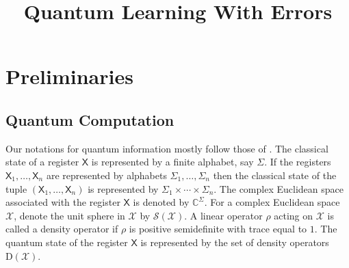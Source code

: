 \documentclass[11pt]{article}
\title{Quantum Learning With Errors}
\author{
}
\date{}
\theoremstyle{plain}
\theoremstyle{definition}
\def\C{\mathbb{C}}
\def\X{\mathcal{X}}
\def\SX{\mathcal{S(X)}}
\begin{document}
\maketitle








\section{Preliminaries}
\label{sec:preli}



\subsection{Quantum Computation}

Our notations for quantum information mostly follow those of \cite{watrous2018theory}. The classical state of a register $\mathsf{X}$ is represented by a finite alphabet, say $\Sigma$. If the registers $\mathsf{X}_1, \dots, \mathsf{X}_n$ are represented by alphabets $\Sigma_1, \dots, \Sigma_n$ then the classical state of the tuple $(\mathsf{X}_1, \dots, \mathsf{X}_n)$ is represented by $\Sigma_1 \times \cdots \times \Sigma_n$. The complex Euclidean space associated with the register $\mathsf{X}$ is denoted by $\C^\Sigma$. For a complex Euclidean space $\X$, denote the unit sphere in $\X$ by $\SX$. A linear operator $\rho$ acting on $\X$ is called a density operator if $\rho$ is positive semidefinite with trace equal to $1$. The quantum state of the register $\mathsf{X}$ is represented by the set of density operators $\text{D}(\X)$.
\end{document}
